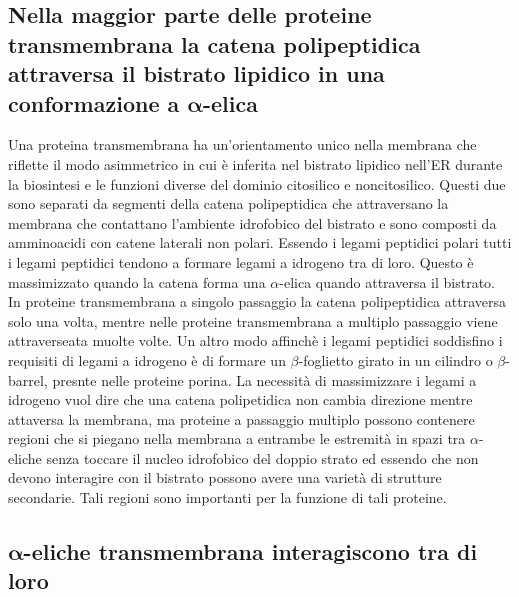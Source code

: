 \subsection{Nella maggior parte delle proteine transmembrana la catena polipeptidica attraversa il bistrato lipidico in una conformazione a $\mathbf{\alpha}$-elica}
Una proteina transmembrana ha un'orientamento unico nella membrana che riflette il modo asimmetrico in cui \`e inferita nel bistrato lipidico nell'ER durante la biosintesi e le 
funzioni diverse del dominio citosilico e noncitosilico. Questi due sono separati da segmenti della catena polipeptidica che attraversano la membrana che contattano l'ambiente 
idrofobico del bistrato e sono composti da amminoacidi con catene laterali non polari. Essendo i legami peptidici polari tutti i legami peptidici tendono a formare legami a idrogeno tra
di loro. Questo \`e massimizzato quando la catena forma una $\alpha$-elica quando attraversa il bistrato. In proteine transmembrana a singolo passaggio la catena polipeptidica attraversa
solo una volta, mentre nelle proteine transmembrana a multiplo passaggio viene attraverseata muolte volte. Un altro modo affinch\`e i legami peptidici soddisfino i requisiti di 
legami a idrogeno \`e di formare un $\beta$-foglietto girato in un cilindro o $\beta$-barrel, presnte nelle proteine porina. La necessit\`a di massimizzare i legami a idrogeno vuol dire
che una catena polipetidica non cambia direzione mentre attaversa la membrana, ma proteine a passaggio multiplo possono contenere regioni che si piegano nella membrana a entrambe le 
estremit\`a in spazi tra $\alpha$-eliche senza toccare il nucleo idrofobico del doppio strato ed essendo che non devono interagire con il bistrato possono avere una variet\`a di 
strutture secondarie. Tali regioni sono importanti per la funzione di tali proteine. 
\subsection{$\mathbf{\alpha}$-eliche transmembrana interagiscono tra di loro}

